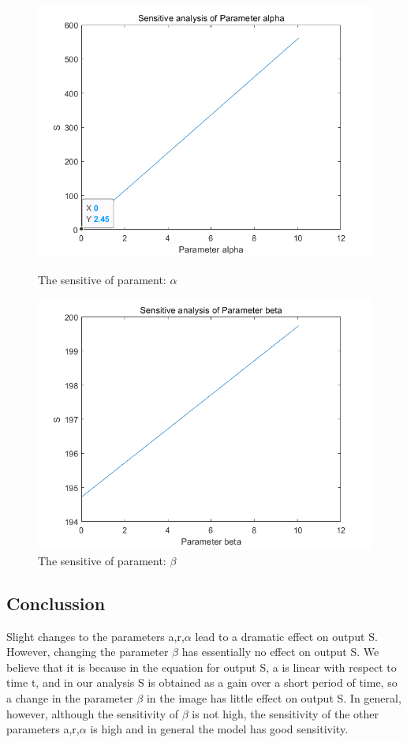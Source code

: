 \documentclass{mcmthesis}
\numberwithin{figure}{section}
\numberwithin{table}{section}
\numberwithin{equation}{section}
\begin{document}
\begin{figure}[htbp]
	\centering
	\begin{minipage}[t]{0.48\linewidth}
	\centering
	\includegraphics[width=0.7\linewidth]{./figures/sen_alpha.png}
	\caption{The sensitive of parament: $\alpha$}
	\label{F 1.1}
\end{minipage}\hfill
	\begin{minipage}[t]{0.48\linewidth}
\centering
\includegraphics[width=0.7\linewidth]{./figures/sen_beta.png}
\caption{The sensitive of parament: $\beta$
		}
\label{F 1.2}
\end{minipage}\hfill
\end{figure}


\subsection{Conclussion}

Slight changes to the parameters a,r,$\alpha$ lead to a dramatic effect on output S. However, changing the parameter $\beta$ has essentially no effect on output S. We believe that it is because in the equation for output S, a is linear with respect to time t, and in our analysis S is obtained as a gain over a short period of time, so a change in the parameter $\beta$ in the image has little effect on output S. In general, however, although the sensitivity of $\beta$ is not high, the sensitivity of the other parameters a,r,$\alpha$ is high and in general the model has good sensitivity.
\end{document}
